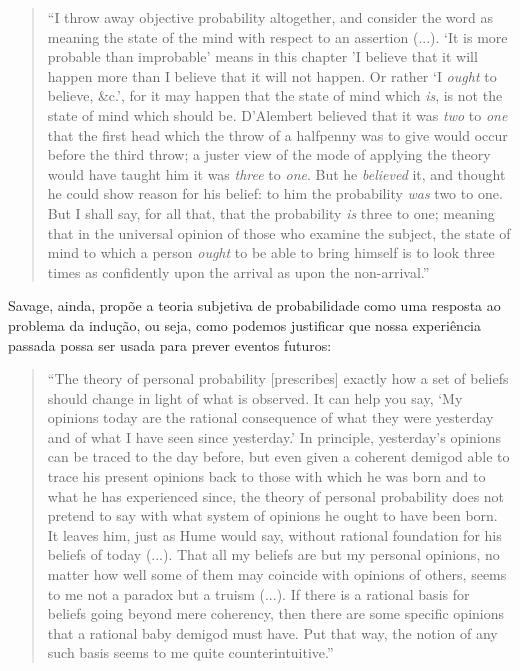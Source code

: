\begin{quote}
``I throw away objective probability altogether, and consider the word as meaning the state of the mind with respect to an 
assertion (...). `It is more probable than improbable' means in this chapter 'I believe that it will happen more than I 
believe that it will not happen. Or rather `I {\em ought} to believe, \&c.', for it may happen that the state of mind which {\em
is}, is not the state of mind which should be. 
D'Alembert believed that it was {\em two} to {\em one} that the first head which the throw of a halfpenny was to give would occur
before the third throw; a juster view of the mode of applying the theory would have taught him it was {\em three} to {\em one}.
But he {\em believed} it, and thought he could show reason for his belief: to him the probability {\em was} two to one. But 
I shall say, for all that, that the probability {\em is} three to one; meaning that in the universal opinion of those who
examine the subject, the state of mind to which a person {\em ought} to be able to bring himself is to look three times
as confidently upon the arrival as upon the non-arrival.''\citep{deMorgan1847}
\end{quote}

Savage, ainda, propõe a teoria subjetiva de probabilidade como uma resposta ao problema da indução, ou seja,
como podemos justificar que nossa experiência passada possa ser usada para prever eventos futuros:

\begin{quote}
``The theory of personal probability [prescribes] exactly how a set of beliefs should change in light of what is observed.
It can help you say, `My opinions today are the rational consequence of what they were yesterday and of what I have seen
since yesterday.' In principle, yesterday's opinions can be traced to the day before, but even given a coherent demigod
able to trace his present opinions back to those with which he was born and to what he has experienced since, the theory
of personal probability does not pretend to say with what system of opinions he ought to have been born. It leaves him, just
as Hume would say, without rational foundation for his beliefs of today (...). That all my beliefs are but my personal
opinions, no matter how well some of them may coincide with opinions of others, seems to me not a paradox but a truism (...).
If there is a rational basis for beliefs going beyond mere coherency, then there are some specific opinions that a rational
baby demigod must have. Put that way, the notion of any such basis seems to me quite counterintuitive.'' \citep{Savage67}
\end{quote}


